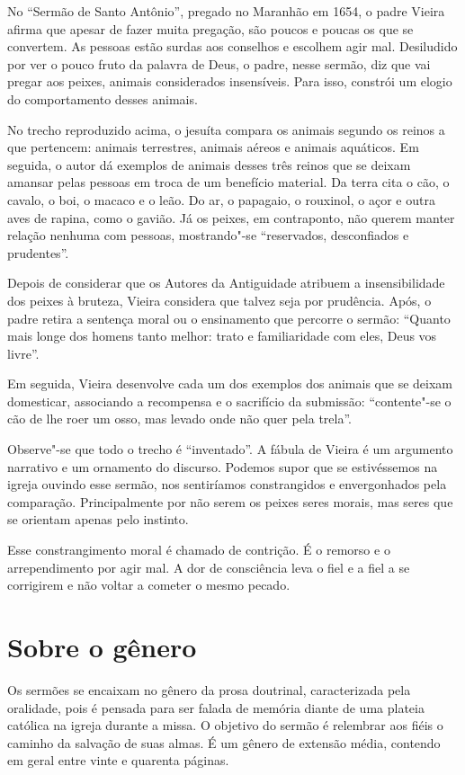 No ``Sermão de Santo Antônio'', pregado no Maranhão em 1654, o padre
Vieira afirma que apesar de fazer muita pregação, são poucos e poucas os
que se convertem. As pessoas estão surdas aos conselhos e escolhem agir
mal. Desiludido por ver o pouco fruto da palavra de Deus, o padre, nesse
sermão, diz que vai pregar aos peixes, animais considerados insensíveis.
Para isso, constrói um elogio do comportamento desses animais.

No trecho reproduzido acima, o jesuíta compara os animais segundo os
reinos a que pertencem: animais terrestres, animais aéreos e animais
aquáticos. Em seguida, o autor dá exemplos de animais desses três reinos
que se deixam amansar pelas pessoas em troca de um benefício material.
Da terra cita o cão, o cavalo, o boi, o macaco e o leão. Do ar, o
papagaio, o rouxinol, o açor e outra aves de rapina, como o gavião. Já
os peixes, em contraponto, não querem manter relação nenhuma com
pessoas, mostrando"-se ``reservados, desconfiados e prudentes''.

Depois de considerar que os Autores da Antiguidade atribuem a
insensibilidade dos peixes à bruteza, Vieira considera que talvez seja
por prudência. Após, o padre retira a sentença moral ou o ensinamento
que percorre o sermão: ``Quanto mais longe dos homens tanto melhor:
trato e familiaridade com eles, Deus vos livre''.

Em seguida, Vieira desenvolve cada um dos exemplos dos animais que se
deixam domesticar, associando a recompensa e o sacrifício da submissão:
``contente"-se o cão de lhe roer um osso, mas levado onde não quer pela
trela''.

Observe"-se que todo o trecho é ``inventado''. A fábula de Vieira é um
argumento narrativo e um ornamento do discurso. Podemos supor que se
estivéssemos na igreja ouvindo esse sermão, nos sentiríamos
constrangidos e envergonhados pela comparação. Principalmente por não
serem os peixes seres morais, mas seres que se orientam apenas pelo
instinto.

Esse constrangimento moral é chamado de contrição. É o remorso e o
arrependimento por agir mal. A dor de consciência leva o fiel e a fiel a
se corrigirem e não voltar a cometer o mesmo pecado.


\section{Sobre o gênero}

Os sermões se encaixam no gênero da prosa doutrinal, caracterizada pela oralidade, pois é pensada para ser falada de memória diante
de uma plateia católica na igreja durante a missa. O objetivo do sermão
é relembrar aos fiéis o caminho da salvação de suas almas. É um gênero
de extensão média, contendo em geral entre vinte e quarenta páginas.

